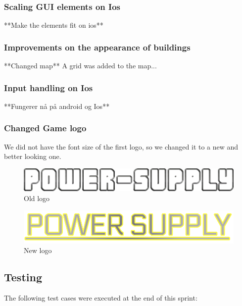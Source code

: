 	\subsubsection*{Scaling GUI elements on Ios}
		**Make the elements fit on ios**
	\subsubsection*{Improvements on the appearance of buildings}
		**Changed map**
		A grid was added to the map...
	\subsubsection*{Input handling on Ios}
		**Fungerer nå på android og Ios**

	\subsubsection*{Changed Game logo}
		We did not have the font size of the first logo, so we changed it to a new 
		and better looking one. 

		\begin{figure}
			\centering
			\includegraphics[scale=0.4]{pictures/logo2.png}
			\caption{Old logo}
		\end{figure}

		\begin{figure}
			\centering
			\includegraphics[scale=0.4]{pictures/newLogo.png}
			\caption{New logo}
		\end{figure}


\subsection{Testing}

	The following test cases were executed at the end of this sprint:


